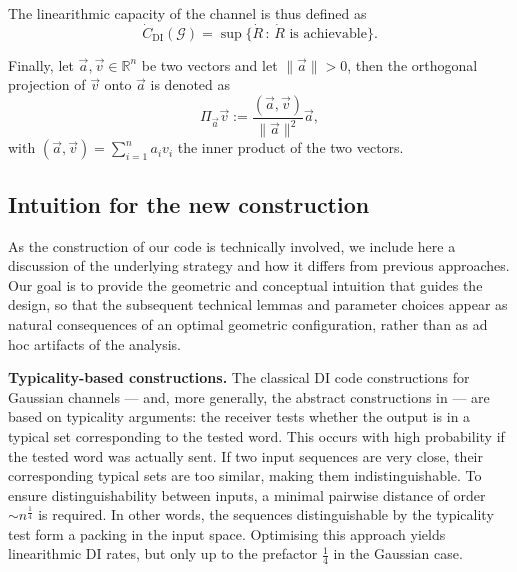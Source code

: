 \documentclass[10pt,conference]{IEEEtran}
\newcommand{\1}{\mathds{1}}
\newcommand{\RR}{\mathbb{R}}
\newcommand{\cG}{\mathcal{G}}
\begin{document}
The linearithmic capacity of the channel is thus defined as
\begin{equation}\label{eq:def_capacity}
\dot{C}_{\mathrm{DI}}(\cG)=
\sup\bigl\{\dot{R}\,:\,\dot{R}\text{ is achievable}\bigr\}.
\end{equation}

Finally, let $\vec{a},\vec{v}\in\RR^n$ be two vectors and let $\|\vec{a}\|>0$, then the orthogonal projection of $\vec{v}$ onto $\vec{a}$ is denoted as
\begin{equation}\label{eq:proj_definition}
  \Pi_{\vec{a}}\vec{v} := \frac{(\vec{a},\vec{v})}{\|\vec{a}\|^2} \vec{a},
\end{equation}
with $(\vec{a},\vec{v})=\sum_{i=1}^na_iv_i$ the inner product of the two vectors. 











\subsection{Intuition for the new construction}\label{ssec:intuition}
As the construction of our code is technically involved, we include here a discussion of the underlying strategy and how it differs from previous approaches. Our goal is to provide the geometric and conceptual intuition that guides the design, so that the subsequent technical lemmas and parameter choices appear as natural consequences of an optimal geometric configuration, rather than as ad hoc artifacts of the analysis.

\medskip

\noindent\textbf{Typicality-based constructions.} 
The classical DI code constructions for Gaussian channels \cite{SPBD:DI_power,DI-fading,RRGauss-arXiv} — and, more generally, the abstract constructions in \cite{CDBW:DI_classical,CDBW:Reliability-TCOM} — are based on typicality arguments: the receiver tests whether the output is in a typical set corresponding to the tested word. This occurs with high probability if the tested word was actually sent. If two input sequences are very close, their corresponding typical sets are too similar, making them indistinguishable. To ensure distinguishability between inputs, a minimal pairwise distance of order $\sim n^{\frac14}$ is required. In other words, the sequences distinguishable by the typicality test form a packing in the input space. Optimising this approach yields linearithmic DI rates, but only up to the prefactor $\frac14$ in the Gaussian case.
\end{document}
